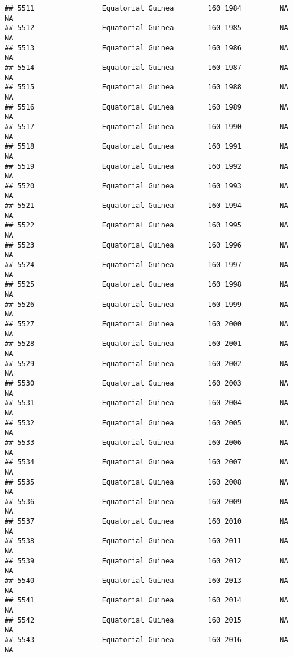 \documentclass[
]{article}
\begin{document}
\begin{verbatim}
## 5511                Equatorial Guinea        160 1984         NA         NA
## 5512                Equatorial Guinea        160 1985         NA         NA
## 5513                Equatorial Guinea        160 1986         NA         NA
## 5514                Equatorial Guinea        160 1987         NA         NA
## 5515                Equatorial Guinea        160 1988         NA         NA
## 5516                Equatorial Guinea        160 1989         NA         NA
## 5517                Equatorial Guinea        160 1990         NA         NA
## 5518                Equatorial Guinea        160 1991         NA         NA
## 5519                Equatorial Guinea        160 1992         NA         NA
## 5520                Equatorial Guinea        160 1993         NA         NA
## 5521                Equatorial Guinea        160 1994         NA         NA
## 5522                Equatorial Guinea        160 1995         NA         NA
## 5523                Equatorial Guinea        160 1996         NA         NA
## 5524                Equatorial Guinea        160 1997         NA         NA
## 5525                Equatorial Guinea        160 1998         NA         NA
## 5526                Equatorial Guinea        160 1999         NA         NA
## 5527                Equatorial Guinea        160 2000         NA         NA
## 5528                Equatorial Guinea        160 2001         NA         NA
## 5529                Equatorial Guinea        160 2002         NA         NA
## 5530                Equatorial Guinea        160 2003         NA         NA
## 5531                Equatorial Guinea        160 2004         NA         NA
## 5532                Equatorial Guinea        160 2005         NA         NA
## 5533                Equatorial Guinea        160 2006         NA         NA
## 5534                Equatorial Guinea        160 2007         NA         NA
## 5535                Equatorial Guinea        160 2008         NA         NA
## 5536                Equatorial Guinea        160 2009         NA         NA
## 5537                Equatorial Guinea        160 2010         NA         NA
## 5538                Equatorial Guinea        160 2011         NA         NA
## 5539                Equatorial Guinea        160 2012         NA         NA
## 5540                Equatorial Guinea        160 2013         NA         NA
## 5541                Equatorial Guinea        160 2014         NA         NA
## 5542                Equatorial Guinea        160 2015         NA         NA
## 5543                Equatorial Guinea        160 2016         NA         NA

\end{verbatim}
\end{document}
